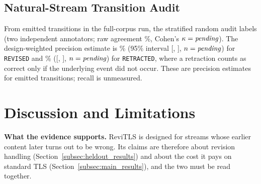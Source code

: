 \documentclass[journal]{IEEEtran}
\begin{document}
\subsection{Natural-Stream Transition Audit}
\label{subsec:error_analysis}

From \AuditAllPop{} emitted transitions in the full-corpus run, the stratified random audit labels \AuditAllN{} (two independent annotators; raw agreement \AuditAgree{}\%, Cohen's $\kappa=\textit{pending}$). The design-weighted precision estimate is \AuditRevPrec{}\% (95\% interval [\AuditRevLo{}, \AuditRevHi{}], $n=\textit{pending}$) for \texttt{REVISED} and \AuditRetPrec{}\% ([\AuditRetLo{}, \AuditRetHi{}], $n=\textit{pending}$) for \texttt{RETRACTED}, where a retraction counts as correct only if the underlying event did not occur. These are precision estimates for emitted transitions; recall is unmeasured.


\section{Discussion and Limitations}
\label{sec:discussion}

\textbf{What the evidence supports.} ReviTLS is designed for streams whose earlier content later turns out to be wrong. Its claims are therefore about revision handling (Section~\ref{subsec:heldout_results}) and about the cost it pays on standard TLS (Section~\ref{subsec:main_results}), and the two must be read together.
\end{document}
